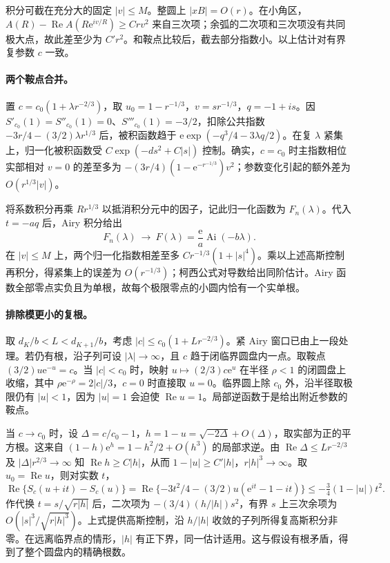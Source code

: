 \documentclass[UTF8,fontset=fandol,11pt,a4paper]{ctexart}
\newcommand{\Rea}{\operatorname{Re}}
\newcommand{\expo}{\mathrm e}
\begin{document}
积分可截在充分大的固定 $|v|\le M$。整圆上 $|xB|=O(r)$。在小角区，$A(R)-\Rea A(R\expo^{iv/R})\ge C r v^2$ 来自三次项；余弧的二次项和三次项没有共同极大点，故此差至少为 $C' r^2$。和鞍点比较后，截去部分指数小。以上估计对有界复参数 $c$ 一致。

\paragraph{两个鞍点合并。}
置 $c=c_0(1+\lambda r^{-2/3})$，取 $u_0=1-r^{-1/3}$，$v=sr^{-1/3}$，$q=-1+is$。因 $S'_{c_0}(1)=S''_{c_0}(1)=0$、$S'''_{c_0}(1)=-3/2$，扣除公共指数 $-3r/4-(3/2)\lambda r^{1/3}$ 后，被积函数趋于 $\expo\exp(-q^3/4-3\lambda q/2)$。在复 $\lambda$ 紧集上，归一化被积函数受 $C\exp(-d s^2+C|s|)$ 控制。确实，$c=c_0$ 时主指数相位实部相对 $v=0$ 的差至多为 $-(3r/4)(1-\expo^{-r^{-1/3}})v^2$；参数变化引起的额外差为 $O(r^{1/3}|v|)$。

将系数积分再乘 $Rr^{1/3}$ 以抵消积分元中的因子，记此归一化函数为 $F_n(\lambda)$。代入 $t=-a q$ 后，Airy 积分给出
\[
 F_n(\lambda)\ \longrightarrow\ F(\lambda)=\frac{\expo}{a}\operatorname{Ai}(-b\lambda).
\]
在 $|v|\le M$ 上，两个归一化指数相差至多 $Cr^{-1/3}(1+|s|^4)$。乘以上述高斯控制再积分，得紧集上的误差为 $O(r^{-1/3})$；柯西公式对导数给出同阶估计。Airy 函数全部零点实负且为单根，故每个极限零点的小圆内恰有一个实单根。

\paragraph{排除模更小的复根。}
取 $d_K/b<L<d_{K+1}/b$，考虑 $|c|\le c_0(1+Lr^{-2/3})$。紧 Airy 窗口已由上一段处理。若仍有根，沿子列可设 $|\lambda|\to\infty$，且 $c$ 趋于闭临界圆盘内一点。取鞍点 $(3/2)u\expo^{-u}=c$。当 $|c|<c_0$ 时，映射 $u\mapsto(2/3)c\expo^u$ 在半径 $\rho<1$ 的闭圆盘上收缩，其中 $\rho\expo^{-\rho}=2|c|/3$，$c=0$ 时直接取 $u=0$。临界圆上除 $c_0$ 外，沿半径取极限仍有 $|u|<1$，因为 $|u|=1$ 会迫使 $\Rea u=1$。局部逆函数于是给出附近参数的鞍点。

当 $c\to c_0$ 时，设 $\Delta=c/c_0-1$，$h=1-u=\sqrt{-2\Delta}+O(\Delta)$，取实部为正的平方根。这来自 $(1-h)\expo^h=1-h^2/2+O(h^3)$ 的局部求逆。由 $\Rea\Delta\le Lr^{-2/3}$ 及 $|\Delta|r^{2/3}\to\infty$ 知 $\Rea h\ge C|h|$，从而 $1-|u|\ge C'|h|$，$r|h|^3\to\infty$。取 $u_0=\Rea u$，则对实数 $t$，
\[
 \Rea\{S_c(u+it)-S_c(u)\}
 =\Rea\{-3t^2/4-(3/2)u(\expo^{it}-1-it)\}
 \le-\tfrac34(1-|u|)t^2 .
\]
作代换 $t=s/\sqrt{r|h|}$ 后，二次项为 $-(3/4)(h/|h|)s^2$，有界 $s$ 上三次余项为 $O(|s|^3/\sqrt{r|h|^3})$。上式提供高斯控制，沿 $h/|h|$ 收敛的子列所得复高斯积分非零。在远离临界点的情形，$|h|$ 有正下界，同一估计适用。这与假设有根矛盾，得到了整个圆盘内的精确根数。
\end{document}
